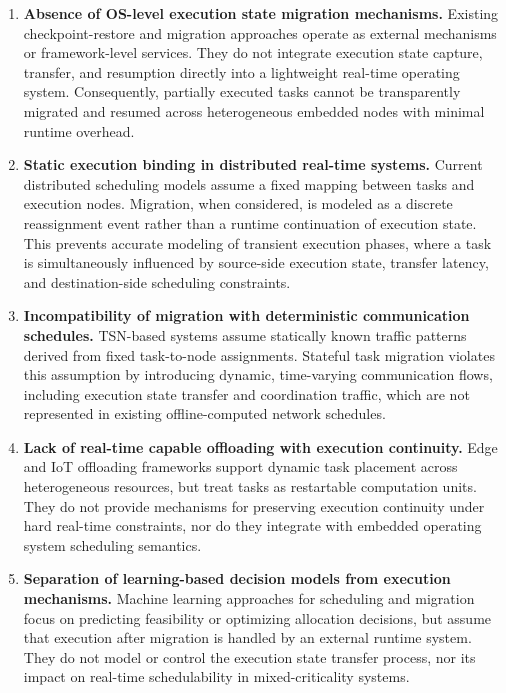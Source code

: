 \begin{enumerate}
	
	\item \textbf{Absence of OS-level execution state migration mechanisms.}  
	Existing checkpoint-restore and migration approaches operate as external mechanisms or
	framework-level services. They do not integrate execution state capture, transfer, and
	resumption directly into a lightweight real-time operating system. Consequently, partially
	executed tasks cannot be transparently migrated and resumed across heterogeneous embedded
	nodes with minimal runtime overhead.
	
	\item \textbf{Static execution binding in distributed real-time systems.}  
	Current distributed scheduling models assume a fixed mapping between tasks and execution
	nodes. Migration, when considered, is modeled as a discrete reassignment event rather than
	a runtime continuation of execution state. This prevents accurate modeling of transient
	execution phases, where a task is simultaneously influenced by source-side execution state,
	transfer latency, and destination-side scheduling constraints.
	
	\item \textbf{Incompatibility of migration with deterministic communication schedules.}  
	TSN-based systems assume statically known traffic patterns derived from fixed task-to-node
	assignments. Stateful task migration violates this assumption by introducing dynamic,
	time-varying communication flows, including execution state transfer and coordination traffic,
	which are not represented in existing offline-computed network schedules.
	
	\item \textbf{Lack of real-time capable offloading with execution continuity.}  
	Edge and IoT offloading frameworks support dynamic task placement across heterogeneous
	resources, but treat tasks as restartable computation units. They do not provide mechanisms
	for preserving execution continuity under hard real-time constraints, nor do they integrate
	with embedded operating system scheduling semantics.
	
	\item \textbf{Separation of learning-based decision models from execution mechanisms.}  
	Machine learning approaches for scheduling and migration focus on predicting feasibility or
	optimizing allocation decisions, but assume that execution after migration is handled by an
	external runtime system. They do not model or control the execution state transfer process,
	nor its impact on real-time schedulability in mixed-criticality systems.
	
\end{enumerate}

